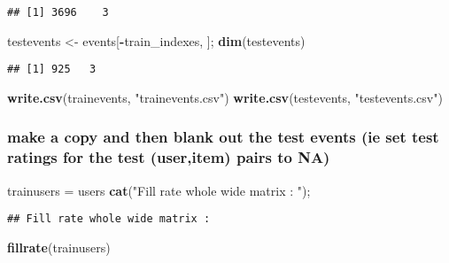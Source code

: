 \documentclass[]{article}
\newenvironment{Shaded}{\begin{snugshade}}{\end{snugshade}}
\newcommand{\KeywordTok}[1]{\textcolor[rgb]{0.13,0.29,0.53}{\textbf{#1}}}
\newcommand{\NormalTok}[1]{#1}
\newcommand{\OperatorTok}[1]{\textcolor[rgb]{0.81,0.36,0.00}{\textbf{#1}}}
\newcommand{\StringTok}[1]{\textcolor[rgb]{0.31,0.60,0.02}{#1}}
\begin{document}
\begin{verbatim}
## [1] 3696    3
\end{verbatim}

\begin{Shaded}
\begin{Highlighting}[]
\NormalTok{testevents  <-}\StringTok{ }\NormalTok{events[}\OperatorTok{-}\NormalTok{train_indexes, ]; }\KeywordTok{dim}\NormalTok{(testevents)}
\end{Highlighting}
\end{Shaded}

\begin{verbatim}
## [1] 925   3
\end{verbatim}

\begin{Shaded}
\begin{Highlighting}[]
\KeywordTok{write.csv}\NormalTok{(trainevents, }\StringTok{"trainevents.csv"}\NormalTok{)}
\KeywordTok{write.csv}\NormalTok{(testevents, }\StringTok{"testevents.csv"}\NormalTok{)}
\end{Highlighting}
\end{Shaded}

\hypertarget{make-a-copy-and-then-blank-out-the-test-events-ie-set-test-ratings-for-the-test-useritem-pairs-to-na}{%
\subsubsection{make a copy and then blank out the test events (ie set
test ratings for the test (user,item) pairs to
NA)}\label{make-a-copy-and-then-blank-out-the-test-events-ie-set-test-ratings-for-the-test-useritem-pairs-to-na}}

\begin{Shaded}
\begin{Highlighting}[]
\NormalTok{trainusers =}\StringTok{ }\NormalTok{users}
\KeywordTok{cat}\NormalTok{(}\StringTok{"Fill rate whole wide matrix : "}\NormalTok{); }
\end{Highlighting}
\end{Shaded}

\begin{verbatim}
## Fill rate whole wide matrix :
\end{verbatim}

\begin{Shaded}
\begin{Highlighting}[]
\KeywordTok{fillrate}\NormalTok{(trainusers)}
\end{Highlighting}
\end{Shaded}
\end{document}
